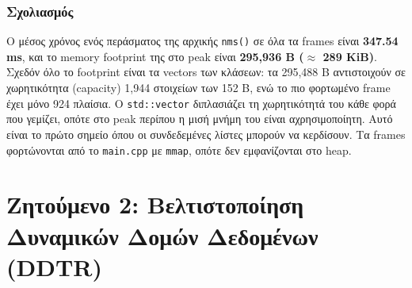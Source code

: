\documentclass[11pt,a4paper]{article}
\newcommand{\en}[1]{\textlatin{#1}}
\begin{document}
\subsubsection*{Σχολιασμός}
Ο μέσος χρόνος ενός περάσματος της αρχικής \en{\texttt{nms()}} σε όλα τα \en{frames} είναι \textbf{347.54 \en{ms}}, και το \en{memory footprint} της στο \en{peak} είναι \textbf{295{,}936 \en{B} ($\approx$ 289 \en{KiB})}. Σχεδόν όλο το \en{footprint} είναι τα \en{vectors} των κλάσεων: τα 295{,}488 \en{B} αντιστοιχούν σε χωρητικότητα (\en{capacity}) 1{,}944 στοιχείων των 152 \en{B}, ενώ το πιο φορτωμένο \en{frame} έχει μόνο 924 πλαίσια. Ο \en{\texttt{std::vector}} διπλασιάζει τη χωρητικότητά του κάθε φορά που γεμίζει, οπότε στο \en{peak} περίπου η μισή μνήμη του είναι αχρησιμοποίητη. Αυτό είναι το πρώτο σημείο όπου οι συνδεδεμένες λίστες μπορούν να κερδίσουν. Τα \en{frames} φορτώνονται από το \en{\texttt{main.cpp}} με \en{\texttt{mmap}}, οπότε δεν εμφανίζονται στο \en{heap}.

\section{Ζητούμενο 2: Βελτιστοποίηση Δυναμικών Δομών Δεδομένων (\en{DDTR})}
\end{document}
